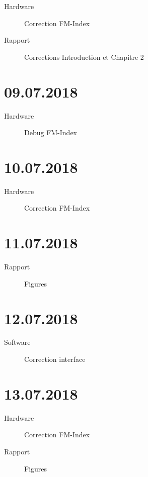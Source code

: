 \begin{description}
	\item [Hardware] Correction FM-Index
	\item [Rapport] Corrections Introduction et Chapitre 2
\end{description}

\section*{09.07.2018}

\begin{description}
	\item [Hardware] Debug FM-Index
\end{description}

\section*{10.07.2018}

\begin{description}
    \item [Hardware] Correction FM-Index
	\end{description}

\section*{11.07.2018}

\begin{description}
	\item [Rapport] Figures 
\end{description}

\section*{12.07.2018}

\begin{description}
	\item [Software] Correction interface
\end{description}

\section*{13.07.2018}

\begin{description}
	\item [Hardware] Correction FM-Index
	\item [Rapport] Figures
\end{description}

